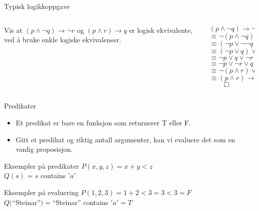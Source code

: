 \begin{frame}{Typisk logikkoppgave}
    \begin{columns}
    \begin{column}{0.48\textwidth}
        Vis at $(p \land \lnot q) \rightarrow \lnot r$ og $(p \land r) \rightarrow q$ er logisk ekvivalente, ved å bruke enkle logiske ekvivalenser.\\[1cm]
    \end{column}
    \begin{column}{0.48\textwidth}
            \pause
            $(p \land \lnot q) \rightarrow \lnot r$ \\
            \pause
            $\equiv \lnot (p \land \lnot q) \lor \lnot r$ \\
            \pause
            $\equiv (\lnot p \lor \lnot \lnot q) \lor \lnot r$ \\
            \pause
            $\equiv (\lnot p \lor q) \lor \lnot r$ \\
            \pause
            $\equiv \lnot p \lor q \lor \lnot r$ \\
            \pause
            $\equiv \lnot p \lor \lnot r \lor q$ \\
            \pause
            $\equiv \lnot (p \land r) \lor q$ \\
            \pause
            $\equiv (p \land r) \rightarrow q$
            $\qed$
    \end{column}
    \end{columns}
\end{frame}

\begin{frame}{Predikater}
    \begin{itemize}
        \item Et predikat er bare en funksjon som returnerer T eller F.
        \item Gitt et predikat og riktig antall argumenter, kan vi evaluere det som en vanlig proposisjon.
    \end{itemize}
    \begin{block}{Eksempler på predikater}
        $P(x, y, z) = x + y < z$\\
        $Q(s)$ = $s$ contains $'a'$
    \end{block}
    \pause
    \begin{block}{Eksempler på evaluering}
        $P(1, 2, 3) = 1 + 2 < 3 = 3 < 3 = F$ \\ 
        $Q($\enquote{Steinar}$) = $\enquote{Steinar} contains $'a' = T$
    \end{block}

\end{frame}